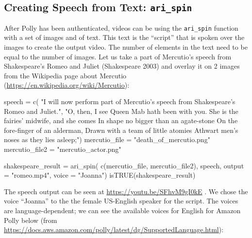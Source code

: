 \hypertarget{creating-speech-from-text-ari_spin}{%
\subsection{\texorpdfstring{Creating Speech from Text:
\texttt{ari\_spin}}{Creating Speech from Text: ari\_spin}}\label{creating-speech-from-text-ari_spin}}

After Polly has been authenticated, videos can be using the
\texttt{ari\_spin} function with a set of images and of text. This text
is the ``script'' that is spoken over the images to create the output
video. The number of elements in the text need to be equal to the number
of images. Let us take a part of Mercutio's speech from Shakespeare's
Romeo and Juliet (Shakespeare 2003) and overlay it on 2 images from the
Wikipedia page about Mercutio
(\url{https://en.wikipedia.org/wiki/Mercutio}):

\begin{Schunk}
\begin{Sinput}
speech =  c(
  "I will now perform part of Mercutio's speech from Shakespeare's Romeo and Juliet.", 
  "O, then, I see Queen Mab hath been with you.
   She is the fairies' midwife, and she comes
   In shape no bigger than an agate-stone
   On the fore-finger of an alderman,
   Drawn with a team of little atomies
   Athwart men's noses as they lies asleep;")
mercutio_file = "death_of_mercutio.png"
mercutio_file2 = "mercutio_actor.png"
\end{Sinput}
\end{Schunk}

\begin{Schunk}
\begin{Sinput}
shakespeare_result = ari_spin(
  c(mercutio_file, mercutio_file2),
  speech, output = "romeo.mp4", voice = "Joanna")
isTRUE(shakespeare_result)
\end{Sinput}
\end{Schunk}

The speech output can be seen at \url{https://youtu.be/SFhvM9gI0kE} . We
chose the voice ``Joanna'' to the the female US-English speaker for the
script. The voices are language-dependent; we can see the available
voices for English for Amazon Polly below (from
\url{https://docs.aws.amazon.com/polly/latest/dg/SupportedLanguage.html}):

